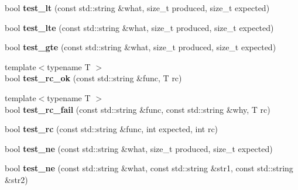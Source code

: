 \begin{DoxyCompactItemize}
bool {\bfseries test\+\_\+lt} (const std\+::string \&what, size\+\_\+t produced, size\+\_\+t expected)
\item 
\mbox{\label{class_botan___tests_1_1_test_1_1_result_ad2784b643b1ee3ddc4b3999fc62c2f25}} 
bool {\bfseries test\+\_\+lte} (const std\+::string \&what, size\+\_\+t produced, size\+\_\+t expected)
\item 
\mbox{\label{class_botan___tests_1_1_test_1_1_result_a2da54467452ce901e08d12403d1b9890}} 
bool {\bfseries test\+\_\+gte} (const std\+::string \&what, size\+\_\+t produced, size\+\_\+t expected)
\item 
\mbox{\label{class_botan___tests_1_1_test_1_1_result_a7c22ad1952e4cb41d1a39df69b1ec521}} 
{\footnotesize template$<$typename T $>$ }\\bool {\bfseries test\+\_\+rc\+\_\+ok} (const std\+::string \&func, T rc)
\item 
\mbox{\label{class_botan___tests_1_1_test_1_1_result_ada38a2442fe00e93976c43e5f52cb09b}} 
{\footnotesize template$<$typename T $>$ }\\bool {\bfseries test\+\_\+rc\+\_\+fail} (const std\+::string \&func, const std\+::string \&why, T rc)
\item 
\mbox{\label{class_botan___tests_1_1_test_1_1_result_a9338a34841aba17e13f926a032f56000}} 
bool {\bfseries test\+\_\+rc} (const std\+::string \&func, int expected, int rc)
\item 
\mbox{\label{class_botan___tests_1_1_test_1_1_result_a2819cb81040f5cf92e7242ed9f0e576a}} 
bool {\bfseries test\+\_\+ne} (const std\+::string \&what, size\+\_\+t produced, size\+\_\+t expected)
\item 
\mbox{\label{class_botan___tests_1_1_test_1_1_result_aa03ddf4ea51696f94d88604bd041dc78}} 
bool {\bfseries test\+\_\+ne} (const std\+::string \&what, const std\+::string \&str1, const std\+::string \&str2)
\item 
\mbox{\label{class_botan___tests_1_1_test_1_1_result_a9c0ce4ea6d6526986079409121dfd565}} 

\end{DoxyCompactItemize}
